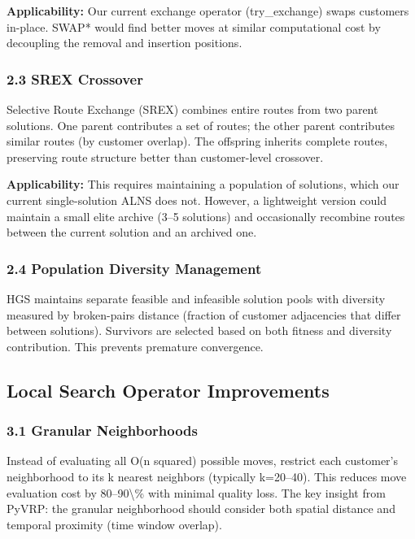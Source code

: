 \documentclass[twocolumn,10pt,letterpaper]{article}
\begin{document}
\textbf{Applicability:} Our current exchange operator (try\_exchange) swaps customers in-place. SWAP* would find better moves at similar computational cost by decoupling the removal and insertion positions.


\subsubsection{2.3 SREX Crossover}

Selective Route Exchange (SREX) combines entire routes from two parent solutions. One parent contributes a set of routes; the other parent contributes similar routes (by customer overlap). The offspring inherits complete routes, preserving route structure better than customer-level crossover.


\textbf{Applicability:} This requires maintaining a population of solutions, which our current single-solution ALNS does not. However, a lightweight version could maintain a small elite archive (3--5 solutions) and occasionally recombine routes between the current solution and an archived one.


\subsubsection{2.4 Population Diversity Management}

HGS maintains separate feasible and infeasible solution pools with diversity measured by broken-pairs distance (fraction of customer adjacencies that differ between solutions). Survivors are selected based on both fitness and diversity contribution. This prevents premature convergence.


\subsection{Local Search Operator Improvements}

\subsubsection{3.1 Granular Neighborhoods}

Instead of evaluating all O(n squared) possible moves, restrict each customer's neighborhood to its k nearest neighbors (typically k=20--40). This reduces move evaluation cost by 80--90\textbackslash{}\% with minimal quality loss. The key insight from PyVRP: the granular neighborhood should consider both spatial distance and temporal proximity (time window overlap).
\end{document}
